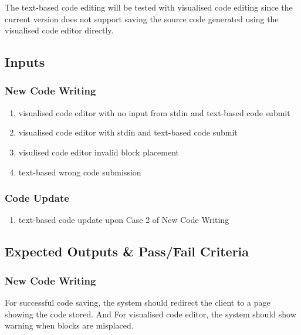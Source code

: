 The text-based code editing will be tested with visualised code editing since the current version does not support saving the source code generated using the visualised code editor directly.

\subsection{Inputs}
\subsubsection{New Code Writing}
\begin{enumerate}
  \item visualised code editor with no input from stdin and text-based code submit
  \item visualised code editor with stdin and text-based code submit
  \item visulised code editor invalid block placement
  \item text-based wrong code submission
\end{enumerate}

\subsubsection{Code Update}
\begin{enumerate}
  \item text-based code update upon Case 2 of New Code Writing
\end{enumerate}

\subsection{Expected Outputs \& Pass/Fail Criteria}
\subsubsection{New Code Writing}
For successful code saving, the system should redirect the client to a page showing the code stored. And For visualised code editor, the system should show warning when blocks are misplaced.

~

